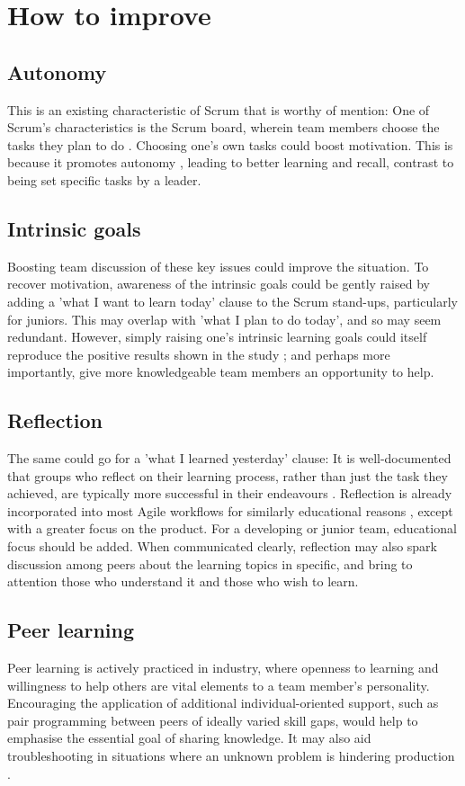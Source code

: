 \documentclass{scrartcl}
\begin{document}
\section{How to improve}
\subsection{Autonomy}
This is an existing characteristic of Scrum that is worthy of mention: One of Scrum's characteristics is the Scrum board, wherein team members choose the tasks they plan to do \cite{scrum}. Choosing one's own tasks could boost motivation. This is because it promotes autonomy \cite{motivation}, leading to better learning and recall, contrast to being set specific tasks by a leader.

\subsection{Intrinsic goals}
Boosting team discussion of these key issues could improve the situation. To recover motivation, awareness of the intrinsic goals could be gently raised by adding a 'what I want to learn today' clause to the Scrum stand-ups, particularly for juniors. This may overlap with 'what I plan to do today', and so may seem redundant. However, simply raising one's intrinsic learning goals could itself reproduce the positive results shown in the study \cite{motivation}; and perhaps more importantly, give more knowledgeable team members an opportunity to help.

\subsection{Reflection}
The same could go for a 'what I learned yesterday' clause: It is well-documented that groups who reflect on their learning process, rather than just the task they achieved, are typically more successful in their endeavours \cite{effectivegroups, learnreflection}. Reflection is already incorporated into most Agile workflows for similarly educational reasons \cite{agile, scrum}, except with a greater focus on the product. For a developing or junior team, educational focus should be added. When communicated clearly, reflection may also spark discussion among peers about the learning topics in specific, and bring to attention those who understand it and those who wish to learn.

\subsection{Peer learning}
Peer learning is actively practiced in industry, where openness to learning \cite{devstudy} and willingness to help others \cite{collaboration} are vital elements to a team member's personality. Encouraging the application of additional individual-oriented support, such as pair programming between peers of ideally varied skill gaps, would help to emphasise the essential goal of sharing knowledge. It may also aid troubleshooting in situations where an unknown problem is hindering production \cite{collaboration, motivation}.
\end{document}
